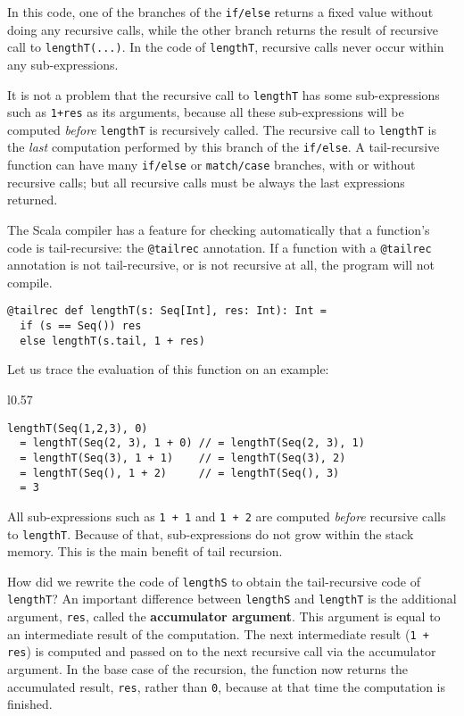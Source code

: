 \noindent In this code, one of the branches of the \lstinline!if/else!
returns a fixed value without doing any recursive calls, while the
other branch returns the result of recursive call to \lstinline!lengthT(...)!.
In the code of \lstinline!lengthT!, recursive calls never occur within
any sub-expressions.

It is not a problem that the recursive call to \lstinline!lengthT!
has some sub-expressions such as \lstinline!1+res! as its arguments,
because all these sub-expressions will be computed \emph{before} \lstinline!lengthT!
is recursively called. The recursive call to \lstinline!lengthT!
is the \emph{last} computation performed by this branch of the \lstinline!if/else!.
A tail-recursive function can have many \lstinline!if/else! or \lstinline!match/case!
branches, with or without recursive calls; but all recursive calls
must be always the last expressions returned.

The Scala compiler has a feature for checking automatically that a
function's code is tail-recursive: the \lstinline!@tailrec! annotation.
If a function with a \lstinline!@tailrec! annotation is not tail-recursive,
or is not recursive at all, the program will not compile.
\begin{lstlisting}
@tailrec def lengthT(s: Seq[Int], res: Int): Int = 
  if (s == Seq()) res
  else lengthT(s.tail, 1 + res)
\end{lstlisting}
Let us trace the evaluation of this function on an example:

\begin{wrapfigure}{l}{0.57\columnwidth}%
\vspace{-0.8\baselineskip}
\begin{lstlisting}
lengthT(Seq(1,2,3), 0)
  = lengthT(Seq(2, 3), 1 + 0) // = lengthT(Seq(2, 3), 1)
  = lengthT(Seq(3), 1 + 1)    // = lengthT(Seq(3), 2)
  = lengthT(Seq(), 1 + 2)     // = lengthT(Seq(), 3)
  = 3
\end{lstlisting}

\vspace{-1.5\baselineskip}
\end{wrapfigure}%

\noindent All sub-expressions such as \lstinline!1 + 1! and \lstinline!1 + 2!
are computed \emph{before} recursive calls to \lstinline!lengthT!.
Because of that, sub-expressions do not grow within the stack memory.
This is the main benefit of tail recursion.

How did we rewrite the code of \lstinline!lengthS! to obtain the
tail-recursive code of \lstinline!lengthT!? An important difference
between \lstinline!lengthS! and \lstinline!lengthT! is the additional
argument, \lstinline!res!, called the \textbf{accumulator argument}.
This argument is equal to an intermediate result of the computation.
The next intermediate result (\lstinline!1 + res!) is computed and
passed on to the next recursive call via the accumulator argument.
In the base case of the recursion, the function now returns the accumulated
result, \lstinline!res!, rather than \lstinline!0!, because at that
time the computation is finished.

